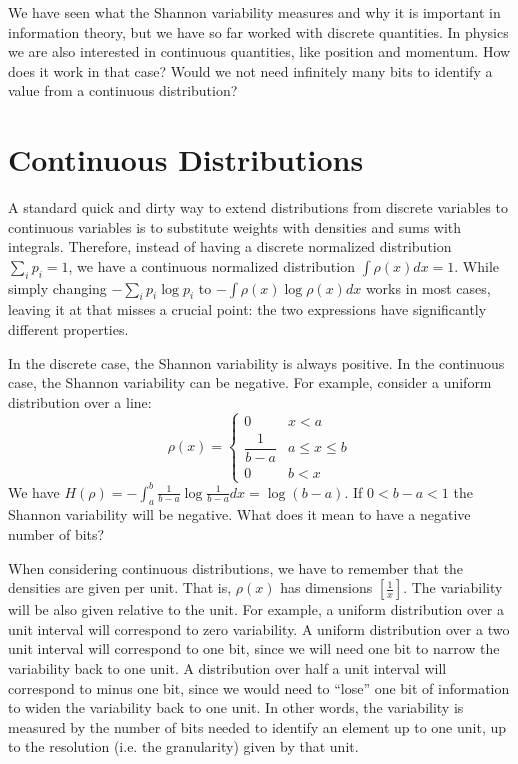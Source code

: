 \documentclass[iopart]{revtex4-1}
\begin{document}
We have seen what the Shannon variability measures and why it is important in information theory, but we have so far worked with discrete quantities. In physics we are also interested in continuous quantities, like position and momentum. How does it work in that case? Would we not need infinitely many bits to identify a value from a continuous distribution?

\section{Continuous Distributions}\label{sec_cont}

A standard quick and dirty way to extend distributions from discrete variables to continuous variables is to substitute weights with densities and sums with integrals. Therefore, instead of having a discrete normalized distribution $\sum_i p_i = 1$, we have a continuous normalized distribution $\int \rho(x)dx=1$. While simply changing $- \sum_i p_i \log p_i$ to $- \int \rho(x) \log \rho(x) dx$ works in most cases, leaving it at that misses a crucial point: the two expressions have significantly different properties.

In the discrete case, the Shannon variability is always positive. In the continuous case, the Shannon variability can be negative. For example, consider a uniform distribution over a line:
\begin{equation}
\rho(x)=
\begin{cases}
0 & x < a\\
\dfrac{1}{b-a} & a \leq x \leq b\\
0 & b < x
\end{cases}
\end{equation}
We have $H(\rho) = - \int_a^b \frac{1}{b-a} \log \frac{1}{b-a} dx = \log (b-a)$. If $0 < b-a < 1$ the Shannon variability will be negative. What does it mean to have a negative number of bits?

When considering continuous distributions, we have to remember that the densities are given per unit. That is, $\rho(x)$ has dimensions $[\frac{1}{x}]$. The variability will be also given relative to the unit. For example, a uniform distribution over a unit interval will correspond to zero variability. A uniform distribution over a two unit interval will correspond to one bit, since we will need one bit to narrow the variability back to one unit. A distribution over half a unit interval will correspond to minus one bit, since we would need to ``lose'' one bit of information to widen the variability back to one unit. In other words, the variability is measured by the number of bits needed to identify an element up to one unit, up to the resolution (i.e. the granularity) given by that unit.
\end{document}
